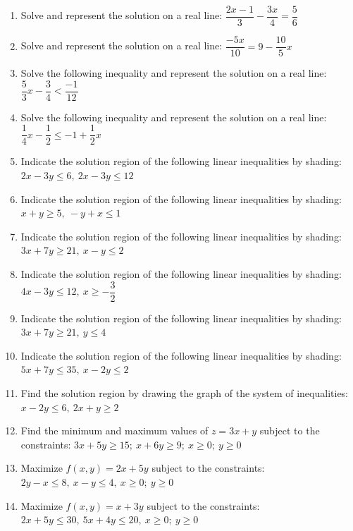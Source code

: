 \documentclass[11pt]{article}
\begin{document}
\begin{enumerate}[leftmargin=1.8cm,start=99]
\item Solve and represent the solution on a real line: $\dfrac{2x-1}{3}-\dfrac{3x}{4}=\dfrac{5}{6}$

\item Solve and represent the solution on a real line: $\dfrac{-5x}{10}=9-\dfrac{10}{5}x$

\item Solve the following inequality and represent the solution on a real line: $\dfrac{5}{3}x-\dfrac{3}{4}<\dfrac{-1}{12}$

\item Solve the following inequality and represent the solution on a real line: $\dfrac{1}{4}x-\dfrac{1}{2}\leq-1+\dfrac{1}{2}x$

\item Indicate the solution region of the following linear inequalities by shading: $2x-3y\leq6,\ 2x-3y\leq12$

\item Indicate the solution region of the following linear inequalities by shading: $x+y\geq5,\ -y+x\leq1$

\item Indicate the solution region of the following linear inequalities by shading: $3x+7y\geq21,\ x-y\leq2$

\item Indicate the solution region of the following linear inequalities by shading: $4x-3y\leq12,\ x\geq-\dfrac{3}{2}$

\item Indicate the solution region of the following linear inequalities by shading: $3x+7y\geq21,\ y\leq4$

\item Indicate the solution region of the following linear inequalities by shading: $5x+7y\leq35,\ x-2y\leq2$

\item Find the solution region by drawing the graph of the system of inequalities: $x-2y\leq6,\ 2x+y\geq2$

\item Find the minimum and maximum values of $z=3x+y$ subject to the constraints: $3x+5y\geq15;\ x+6y\geq9;\ x\geq0;\ y\geq0$

\item Maximize $f(x,y)=2x+5y$ subject to the constraints: $2y-x\leq8,\ x-y\leq4,\ x\geq0;\ y\geq0$

\item Maximize $f(x,y)=x+3y$ subject to the constraints: $2x+5y\leq30,\ 5x+4y\leq20,\ x\geq0;\ y\geq0$


\end{enumerate}
\end{document}
